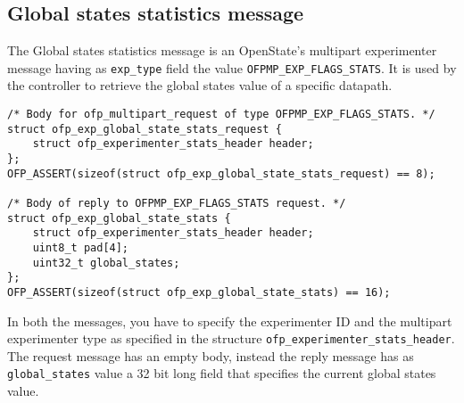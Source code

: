 \subsection{Global states statistics message}

\label{sec:msg_global_stats_proto}

The Global states statistics message is an OpenState's multipart experimenter message having as \texttt{exp\_type} field the value \texttt{OFPMP\_EXP\_FLAGS\_STATS}.
It is used by the controller to retrieve the global states value of a specific datapath.

\begin{verbatim}
/* Body for ofp_multipart_request of type OFPMP_EXP_FLAGS_STATS. */
struct ofp_exp_global_state_stats_request {
    struct ofp_experimenter_stats_header header;
};
OFP_ASSERT(sizeof(struct ofp_exp_global_state_stats_request) == 8);

/* Body of reply to OFPMP_EXP_FLAGS_STATS request. */
struct ofp_exp_global_state_stats {
    struct ofp_experimenter_stats_header header;
    uint8_t pad[4];
    uint32_t global_states;
};
OFP_ASSERT(sizeof(struct ofp_exp_global_state_stats) == 16);
\end{verbatim}
In both the messages, you have to specify the experimenter ID and the multipart experimenter type as specified in the structure \texttt{ofp\_experimenter\_stats\_header}.
The request message has an empty body, instead the reply message has as \texttt{global\_states} value a 32 bit long field that specifies the current global states value.
